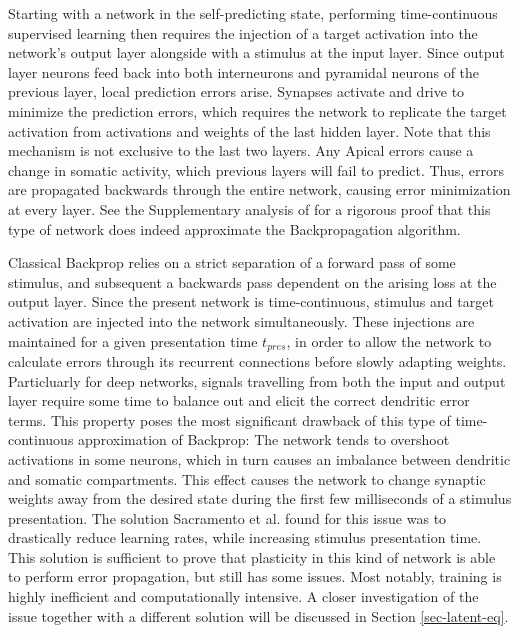 Starting with a network in the self-predicting state, performing time-continuous supervised learning then requires the
injection of a target activation into the network's output layer alongside with a stimulus at the input layer. Since
output layer neurons feed back into both interneurons and pyramidal neurons of the previous layer, local prediction
errors arise. Synapses activate and drive to minimize the prediction errors, which requires the network to replicate the
target activation from activations and weights of the last hidden layer. Note that this mechanism is not exclusive to
the last two layers. Any Apical errors cause a change in somatic activity, which previous layers will fail to predict.
Thus, errors are propagated backwards through the entire network, causing error minimization at every layer. See the
Supplementary analysis of \citep{sacramento2018dendritic} for a rigorous proof that this type of network does indeed
approximate the Backpropagation algorithm.



Classical Backprop relies on a strict separation of a forward pass of some stimulus, and subsequent a backwards
pass dependent on the arising loss at the output layer. Since the present network is time-continuous, stimulus and
target activation are injected into the network simultaneously. These injections are maintained for a given presentation
time $t_{pres}$, in order to allow the network to calculate errors through its recurrent connections before slowly
adapting weights. Particluarly for deep networks, signals travelling from both the input and output layer require some
time to balance out and elicit the correct dendritic error terms. This property poses the most significant drawback of
this type of time-continuous approximation of Backprop: The network tends to overshoot activations in some
neurons, which in turn causes an imbalance between dendritic and somatic compartments. This effect causes the network to
change synaptic weights away from the desired state during the first few milliseconds of a stimulus presentation. The
solution Sacramento et al. found for this issue was to drastically reduce learning rates, while increasing stimulus
presentation time. This solution is sufficient to prove that plasticity in this kind of network is able to perform error
propagation, but still has some issues. Most notably, training is highly inefficient and computationally intensive. A
closer investigation of the issue together with a different solution will be discussed in Section \ref{sec-latent-eq}.




